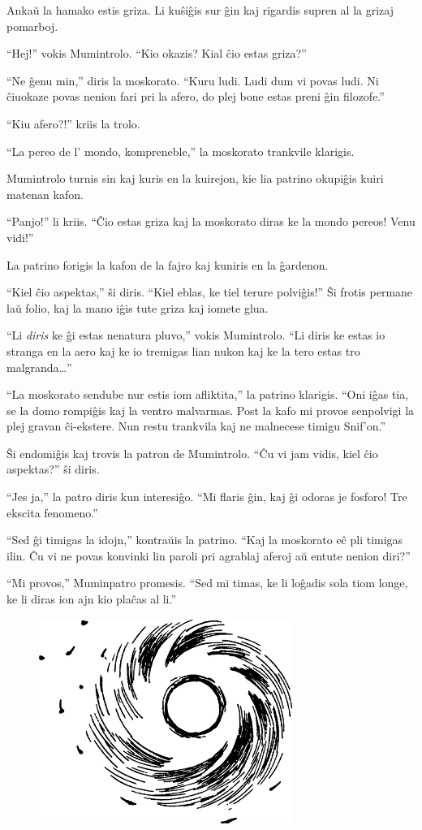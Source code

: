 Ankaŭ la hamako estis griza. Li kuŝiĝis sur ĝin kaj rigardis supren al la grizaj pomarboj.

``Hej!'' vokis Mumintrolo. ``Kio okazis? Kial ĉio estas griza?''

``Ne ĝenu min,'' diris la moskorato. ``Kuru ludi. Ludi dum vi povas ludi. Ni ĉiuokaze povas nenion fari pri la afero, do plej bone estas preni ĝin filozofe.''

``Kiu afero?!'' kriis la trolo.

``La pereo de l' mondo, kompreneble,'' la moskorato trankvile klarigis.

Mumintrolo turnis sin kaj kuris en la kuirejon, kie lia patrino okupiĝis kuiri matenan kafon.

``Panjo!'' li kriis. ``Ĉio estas griza kaj la moskorato diras ke la mondo pereos! Venu vidi!''

La patrino forigis la kafon de la fajro kaj kuniris en la ĝardenon.

``Kiel ĉio aspektas,'' ŝi diris. ``Kiel eblas, ke tiel terure polviĝis!'' Ŝi frotis permane laŭ folio, kaj la mano iĝis tute griza kaj iomete glua.

``Li \emph{diris} ke ĝi estas nenatura pluvo,'' vokis Mumintrolo. ``Li diris ke estas io stranga en la aero kaj ke io tremigas lian nukon kaj ke la tero estas tro malgranda{\ldots}''

``La moskorato sendube nur estis iom afliktita,'' la patrino klarigis. ``Oni iĝas tia, se la domo rompiĝis kaj la ventro malvarmas. Post la kafo mi provos senpolvigi la plej gravan ĉi-ekstere. Nun restu trankvila kaj ne malnecese timigu Snif'on.''

Ŝi endomiĝis kaj trovis la patron de Mumintrolo. ``Ĉu vi jam vidis, kiel ĉio aspektas?'' ŝi diris.

``Jes ja,'' la patro diris kun interesiĝo. ``Mi flaris ĝin, kaj ĝi odoras je fosforo! Tre ekscita fenomeno.''

``Sed ĝi timigas la idojn,'' kontraŭis la patrino. ``Kaj la moskorato eĉ pli timigas ilin. Ĉu vi ne povas konvinki lin paroli pri agrablaj aferoj aŭ entute nenion diri?''

``Mi provos,'' Muminpatro promesis. ``Sed mi timas, ke li loĝadis sola tiom longe, ke li diras ion ajn kio plaĉas al li.''

\begin{figure}[htbp]
\centering
\includegraphics[width=234pt,height=190pt]{2-2.png}
\caption{}
\label{2-2}
\end{figure}


